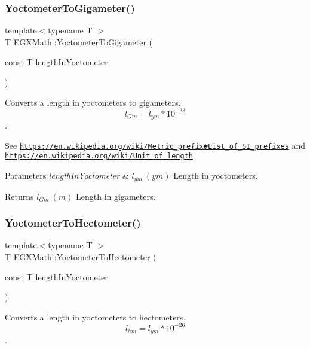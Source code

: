 \subsubsection{\texorpdfstring{Yoctometer\+To\+Gigameter()}{YoctometerToGigameter()}}
{\footnotesize\ttfamily template$<$typename T $>$ \\
T E\+G\+X\+Math\+::\+Yoctometer\+To\+Gigameter (\begin{DoxyParamCaption}\item[{const T}]{length\+In\+Yoctometer }\end{DoxyParamCaption})}



Converts a length in yoctometers to gigameters. \[ l_{Gm}=l_{ym} * 10^{-33} \]. 

See \href{https://en.wikipedia.org/wiki/Metric_prefix#List_of_SI_prefixes}{\tt https\+://en.\+wikipedia.\+org/wiki/\+Metric\+\_\+prefix\#\+List\+\_\+of\+\_\+\+S\+I\+\_\+prefixes} and \href{https://en.wikipedia.org/wiki/Unit_of_length}{\tt https\+://en.\+wikipedia.\+org/wiki/\+Unit\+\_\+of\+\_\+length} 
\begin{DoxyParams}{Parameters}
{\em length\+In\+Yoctometer} & $ l_{ym}\ (ym)$ Length in yoctometers. \\
\hline
\end{DoxyParams}
\begin{DoxyReturn}{Returns}
$ l_{Gm}\ (m)$ Length in gigameters. 
\end{DoxyReturn}
\mbox{\label{group___e_g_x_math-_conversions-_length_conversions-_s_i-_yoctometer-_s_i_ga3f2a47723b097c9c2b38edf4ca14ff03}} 
\subsubsection{\texorpdfstring{Yoctometer\+To\+Hectometer()}{YoctometerToHectometer()}}
{\footnotesize\ttfamily template$<$typename T $>$ \\
T E\+G\+X\+Math\+::\+Yoctometer\+To\+Hectometer (\begin{DoxyParamCaption}\item[{const T}]{length\+In\+Yoctometer }\end{DoxyParamCaption})}



Converts a length in yoctometers to hectometers. \[ l_{hm}=l_{ym} * 10^{-26} \]. 

